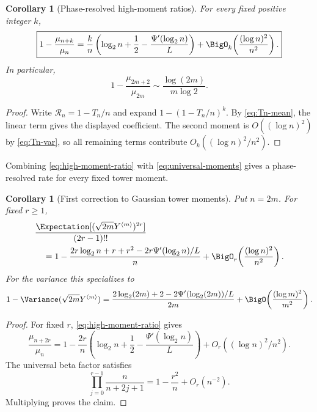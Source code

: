 \documentclass[11pt,oneside]{article}
\newtheorem{corollary}[theorem]{Corollary}
\theoremstyle{definition}
\theoremstyle{remark}
\newcommand{\Tower}[1]{Y^{\langle #1\rangle}}
\begin{document}
\begin{corollary}[Phase-resolved high-moment ratios]
\label{cor:high-moment-ratio}
For every fixed positive integer $k$,
\begin{equation}
 \boxed{
 1-\frac{\mu_{n+k}}{\mu_n}
 =\frac{k}{n}
  \left(
    \log_2n+\frac12-\frac{\Psi'(\log_2n)}{L}
  \right)
 +\BigO_k\!\left(\frac{(\log n)^2}{n^2}\right).}    \label{eq:high-moment-ratio}
\end{equation}
In particular,
\begin{equation}
 1-\frac{\mu_{2m+2}}{\mu_{2m}}
 \sim\frac{\log(2m)}{m\log2}.                      \label{eq:even-ratio-leading}
\end{equation}
\end{corollary}

\begin{proof}
Write $\mathcal R_n=1-T_n/n$ and expand
$1-(1-T_n/n)^k$.  By \eqref{eq:Tn-mean}, the linear term gives the displayed
coefficient.  The second moment is $O((\log n)^2)$ by
\eqref{eq:Tn-var}, so all remaining terms contribute
$O_k((\log n)^2/n^2)$.
\end{proof}

Combining \eqref{eq:high-moment-ratio} with
\eqref{eq:universal-moments} gives a phase-resolved rate for every fixed tower
moment.

\begin{corollary}[First correction to Gaussian tower moments]
\label{cor:tower-moment-correction}
Put $n=2m$.  For fixed $r\ge1$,
\begin{align}
 &\frac{\Expectation[(\sqrt{2m}\Tower{m})^{2r}]}{(2r-1)!!}
 \notag\\
 &\quad=1-
 \frac{
   2r\log_2n+r+r^2-2r\Psi'(\log_2n)/L
 }{n}
 +\BigO_r\!\left(\frac{(\log n)^2}{n^2}\right).    \label{eq:tower-moment-correction}
\end{align}
For the variance this specializes to
\begin{equation}
 1-\Variance(\sqrt{2m}\Tower{m})
 =\frac{2\log_2(2m)+2-2\Psi'(\log_2(2m))/L}{2m}
 +\BigO\!\left(\frac{(\log m)^2}{m^2}\right).       \label{eq:tower-variance-correction}
\end{equation}
\end{corollary}

\begin{proof}
For fixed $r$, \eqref{eq:high-moment-ratio} gives
\[
 \frac{\mu_{n+2r}}{\mu_n}
 =1-\frac{2r}{n}
   \left(\log_2n+\frac12-\frac{\Psi'(\log_2n)}L\right)
   +O_r((\log n)^2/n^2).
\]
The universal beta factor satisfies
\[
 \prod_{j=0}^{r-1}\frac{n}{n+2j+1}
 =1-\frac{r^2}{n}+O_r(n^{-2}).
\]
Multiplying proves the claim.
\end{proof}
\end{document}
